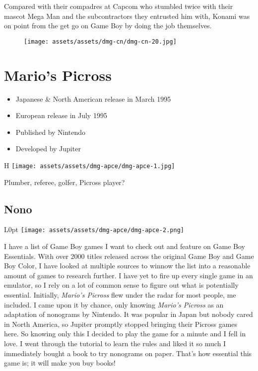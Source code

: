 \documentclass{book}
\begin{document}
Compared with their compadres at Capcom who stumbled twice with their mascot Mega Man and the subcontractors they entrusted him with, Konami was on point from the get go on Game Boy by doing the job themselves.

\begin{figure}[hbt]
\vskip 10pt
\centering \texttt{[image: assets/assets/dmg-cn/dmg-cn-20.jpg]}
\vskip 6pt
\end{figure}


\begingroup \chapter*{Mario’s Picross} \endgroup

\begin{itemize} \setlength\itemsep{-0.4em}
\item Japanese \& North American release in March 1995
\item European release in July 1995
\item Published by Nintendo
\item Developed by Jupiter
\end{itemize}\noindent

\begin{wrapfigure}{H}{\linewidth}
\vskip 4pt
\centering \texttt{[image: assets/assets/dmg-apce/dmg-apce-1.jpg]}\par\pagetwodescription Plumber, referee, golfer, Picross player?\end{wrapfigure}
\clearpage

\FloatBarrier\needspace{10mm}\section*{Nono}\nopagebreak[4]

\begin{wrapfigure}{L}{0pt} \texttt{[image: assets/assets/dmg-apce/dmg-apce-2.png]}\end{wrapfigure}
I have a list of Game Boy games I want to check out and feature on Game Boy Essentials. With over 2000 titles released across the original Game Boy and Game Boy Color, I have looked at multiple sources to winnow the list into a reasonable amount of games to research further. I have yet to fire up every single game in an emulator, so I rely on a lot of common sense to figure out what is potentially essential. Initially, \emph{Mario’s Picross} flew under the radar for most people, me included. I came upon it by chance, only knowing \emph{Mario’s Picross} as an adaptation of nonograms by Nintendo. It was popular in Japan but nobody cared in North America, so Jupiter promptly stopped bringing their Picross games here. So knowing only this I decided to play the game for a minute and I fell in love. I went through the tutorial to learn the rules and liked it so much I immediately bought a book to try nonograms on paper. That’s how essential this game is; it will make you buy books!
\end{document}
